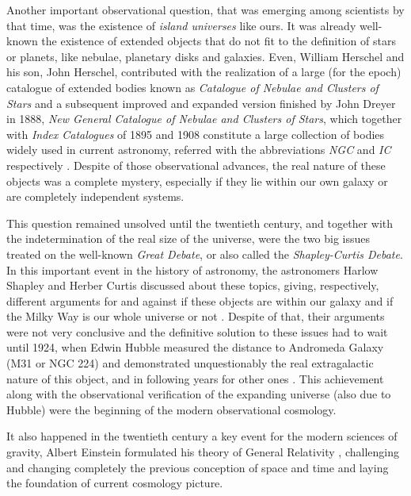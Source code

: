 Another important observational question, that was emerging among 
scientists by that time, was the existence of \textit{island universes} 
like ours. It was already well-known the existence of extended objects 
that do not fit to the definition of stars or planets, like nebulae, 
planetary disks and galaxies. Even, William Herschel and his son, John 
Herschel, contributed with the realization of a large (for the epoch) 
catalogue of extended bodies known as \textit{Catalogue of Nebulae and 
Clusters of Stars} and a subsequent improved and expanded version finished 
by John Dreyer in 1888, \textit{New General Catalogue of Nebulae and 
Clusters of Stars}, which together with \textit{Index Catalogues} of 1895 
and 1908 constitute a large collection of bodies widely used in current 
astronomy, referred with the abbreviations \textit{NGC} and \textit{IC} 
respectively \cite{longair2008}. Despite of those observational advances, 
the real nature of these objects was a complete mystery, especially if they 
lie within our own galaxy or are completely independent systems. 


This question remained unsolved until the twentieth century, and together 
with the indetermination of the real size of the universe, were the two 
big issues treated on the well-known \textit{Great Debate}, or also called 
the \textit{Shapley-Curtis Debate}. In this important event in the history 
of astronomy, the astronomers Harlow Shapley and Herber Curtis discussed 
about these topics, giving, respectively, different arguments for and 
against if these objects are within our galaxy and if the Milky Way is our 
whole universe or not \cite{Curtis1921} \cite{Shapley1921}. Despite of 
that, their arguments were not very conclusive and the definitive solution 
to these issues had to wait until 1924, when Edwin Hubble measured the 
distance to Andromeda Galaxy (M31 or NGC 224) and demonstrated 
unquestionably the real extragalactic nature of this object, and in 
following years for other ones \cite{Hubble1926}. This achievement along 
with the observational verification of the expanding universe (also due to 
Hubble) were the beginning of the modern observational cosmology.


It also happened in the twentieth century a key event for the modern 
sciences of gravity, Albert Einstein formulated his theory of General 
Relativity \cite{Einstein1916}, challenging and changing completely the 
previous conception of space and time and laying the foundation of current 
cosmology picture.


